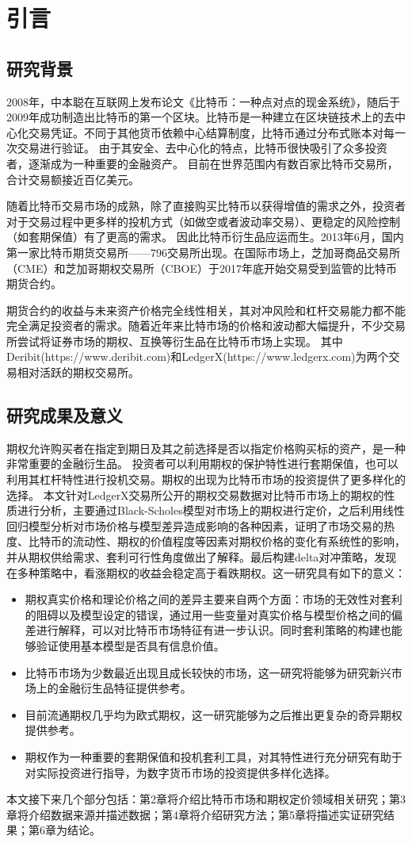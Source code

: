 \chapter{引言}
\section{研究背景}
\par{2008年，中本聪在互联网上发布论文《比特币：一种点对点的现金系统》\cite{Nakamoto_bitcoin:a}，随后于2009年成功制造出比特币的第一个区块。比特币是一种建立在区块链技术上的去中心化交易凭证。不同于其他货币依赖中心结算制度，比特币通过分布式账本对每一次交易进行验证。
由于其安全、去中心化的特点，比特币很快吸引了众多投资者，逐渐成为一种重要的金融资产。
目前在世界范围内有数百家比特币交易所，合计交易额接近百亿美元。
}
\par{随着比特币交易市场的成熟，除了直接购买比特币以获得增值的需求之外，投资者对于交易过程中更多样的投机方式（如做空或者波动率交易）、更稳定的风险控制（如套期保值）有了更高的需求。
因此比特币衍生品应运而生。2013年6月，国内第一家比特币期货交易所——796交易所出现。在国际市场上，芝加哥商品交易所（CME）和芝加哥期权交易所（CBOE）于2017年底开始交易受到监管的比特币期货合约。
}
\par{期货合约的收益与未来资产价格完全线性相关，其对冲风险和杠杆交易能力都不能完全满足投资者的需求。随着近年来比特市场的价格和波动都大幅提升，不少交易所尝试将证券市场的期权、互换等衍生品在比特币市场上实现。
其中Deribit(https://www.deribit.com)和LedgerX(https://www.ledgerx.com)为两个交易相对活跃的期权交易所。}
\section{研究成果及意义}
期权允许购买者在指定到期日及其之前选择是否以指定价格购买标的资产，是一种非常重要的金融衍生品。
投资者可以利用期权的保护特性进行套期保值，也可以利用其杠杆特性进行投机交易。期权的出现为比特币市场的投资提供了更多样化的选择。
本文针对LedgerX交易所公开的期权交易数据对比特币市场上的期权的性质进行分析，主要通过Black-Scholes模型对市场上的期权进行定价，之后利用线性回归模型分析对市场价格与模型差异造成影响的各种因素，证明了市场交易的热度、比特币的流动性、期权的价值程度等因素对期权价格的变化有系统性的影响，并从期权供给需求、套利可行性角度做出了解释。最后构建delta对冲策略，发现在多种策略中，看涨期权的收益会稳定高于看跌期权。这一研究具有如下的意义：
\begin{itemize}
    \item 期权真实价格和理论价格之间的差异主要来自两个方面：市场的无效性对套利的阻碍以及模型设定的错误，通过用一些变量对真实价格与模型价格之间的偏差进行解释，可以对比特币市场特征有进一步认识。同时套利策略的构建也能够验证使用基本模型是否具有信息价值。
    \item  比特币市场为少数最近出现且成长较快的市场，这一研究将能够为研究新兴市场上的金融衍生品特征提供参考。
    \item 目前流通期权几乎均为欧式期权，这一研究能够为之后推出更复杂的奇异期权提供参考。
    \item 期权作为一种重要的套期保值和投机套利工具，对其特性进行充分研究有助于对实际投资进行指导，为数字货币市场的投资提供多样化选择。
  \end{itemize}
  
本文接下来几个部分包括：第2章将介绍比特币市场和期权定价领域相关研究；第3章将介绍数据来源并描述数据；第4章将介绍研究方法；第5章将描述实证研究结果；第6章为结论。
